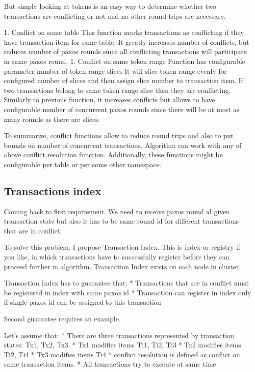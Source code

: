 But simply looking at tokens is an easy way to determine whether two transactions are conflicting or not and no other round-trips are necessary.


1. Conflict on same table
        This function marks transactions as conflicting if they have transaction item for same table. It greatly increases number of conflicts, but reduces number of paxos rounds since all conflicting transactions will participate in same paxos round.
1. Conflict on same token range
        Function has configurable parameter number of token range slices
        It will slice token range evenly for configured number of slices and then assign slice number to transaction item. If two transactions belong to same token range slice then they are conflicting.
        Similarly to previous function, it increases conflicts but allows to have configurable number of concurrent paxos rounds since there will be at most as many rounds as there are slices.


To summarize, conflict functions allow to reduce round trips and also to put bounds on number of concurrent transactions. Algorithm can work with any of above conflict resolution function. Additionally, these functions might be configurable per table or per some other namespace. 




\subsection{Transactions index}


Coming back to first requirement. We need to receive paxos round id given transaction state but also it has to be same round id for different transactions that are in conflict.


To solve this problem, I propose Transaction Index. This is index or registry if you like, in which transactions have to successfully register before they can proceed further in algorithm.        Transaction Index exists on each node in cluster.


Transaction Index has to guarantee that:
* Transactions that are in conflict must be registered in index with same paxos id
* Transaction can register in index only if single paxos id can be assigned to this transaction


Second guarantee requires an example.


Let’s assume that:
* There are three transactions represented by transaction states: Tx1, Tx2, Tx3.
* Tx1 modifies items Ti1, Ti2, Ti3
* Tx2 modifies items Ti2, Ti4
* Tx3 modifies items Ti4
* conflict resolution is defined as conflict on same transaction items.
* All transactions try to execute at same time


